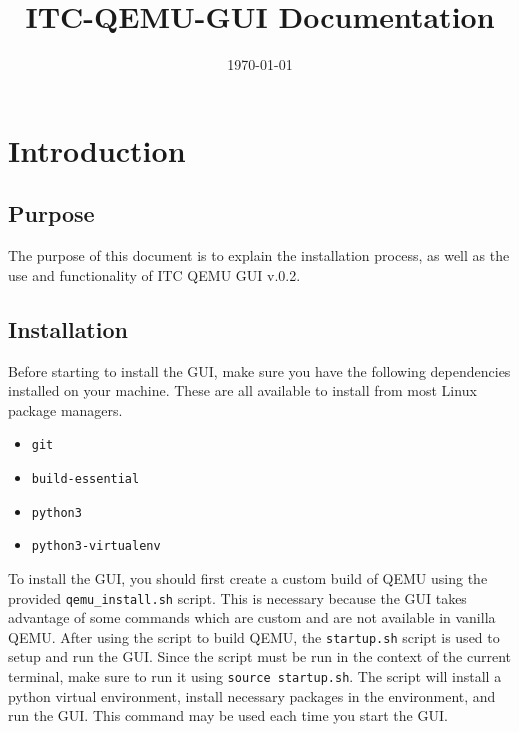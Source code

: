 \documentclass{article}
\title{ITC-QEMU-GUI \version{} Documentation}
\author{}
\date{\today}
\newcommand{\version}{v.0.2}
\newcommand{\code}[1]{\texttt{#1}}
\begin{document}
\maketitle
\tableofcontents



\begin{versionhistory}
\end{versionhistory}

\newpage

\section{Introduction}

\subsection{Purpose}
The purpose of this document is to explain the installation process, as well as the use and functionality of ITC QEMU GUI \version{}.

\subsection{Installation}
Before starting to install the GUI, make sure you have the following dependencies installed on your machine. These are all available to install from most Linux package managers.
\begin{itemize}
    \item \code{git}
    \item \code{build-essential}
    \item \code{python3}
    \item \code{python3-virtualenv}
\end{itemize}

To install the GUI, you should first create a custom build of QEMU using the provided \code{qemu\_install.sh} script. This is necessary because the GUI takes advantage of some commands which are custom and are not available in vanilla QEMU. After using the script to build QEMU, the \code{startup.sh} script is used to setup and run the GUI. Since the script must be run in the context of the current terminal, make sure to run it using \code{source startup.sh}. The script will install a python virtual environment, install necessary packages in the environment, and run the GUI. This command may be used each time you start the GUI.
\end{document}
